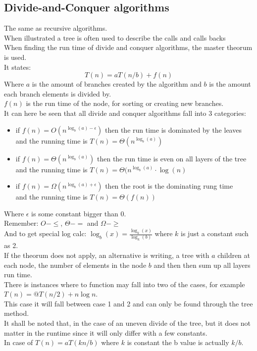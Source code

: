 \documentclass[12pt, a4paper]{article}
\begin{document}
			\subsection{Divide-and-Conquer algorithms}
				The same as recursive algorithms.\\
				When illustrated a tree is often used to describe the calls and calls backs\\
				When finding the run time of divide and conquer algorithms, the master theorum is used.\\
				It states:
				$$T(n)=aT(n/b)+f(n)$$
				Where $a$ is the amount of branches created by the algorithm and $b$ is the amount each branch elements is divided by.\\
				$f(n)$ is the run time of the node, for sorting or creating new branches.\\
				It can here be seen that all divide and conquer algorithms fall into 3 categories:
				\begin{itemize}
					\item if $f(n)=O(n^{\log_b(a)-\epsilon})$ then the run time is dominated by the leaves\\
							  and the running time is $T(n)=\Theta(n^{\log_b(a)})$
					\item if $f(n)=\Theta(n^{\log_b(a)})$ then the run time is even on all layers of the tree\\
						and the running time is $T(n)=\Theta(n^{\log_b(a)}\cdot \log(n)$
			 		\item if $f(n)=\Omega(n^{\log_b(a)+\epsilon})$ then the root is the dominating rung time\\
							  and the running time is $T(n)=\Theta(f(n))$
				\end{itemize}
				Where $\epsilon$ is some constant bigger than 0.\\
				Remember: $O - \leq$, $\Theta - =$ and $\Omega - \geq$\\
				And to get special log calc: $\log_b(x)=\frac{\log_k(x)}{\log_k(b)}$ where $k$ is just a constant such as 2.\\
				If the theorum does not apply, an alternative is writing, a tree with $a$ children at each node, the number of elements in the node $b$ and then then sum up all layers run time.\\[4mm]
				There is instances where to function may fall into two of the cases, for example $T(n)=@T(n/2)+n\log n$.\\
				This case it will fall between case 1 and 2 and can only be found through the tree method.\\
				It shall be noted that, in the case of an uneven divide of the tree, but it does not matter in the runtime since it will only differ with a few constants.\\
				In case of $T(n)=aT(kn/b)$ where $k$ is constant the b value is actually $k/b$.
\end{document}
